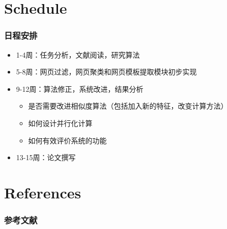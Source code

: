 \documentclass[11pt,presentation]{beamer}
\begin{document}
\section{Schedule}
\label{sec-3}
\begin{frame}
\frametitle{日程安排}
\label{sec-3-1}

\begin{itemize}
\item 1-4周：任务分析，文献阅读，研究算法
\item 5-8周：网页过滤，网页聚类和网页模板提取模块初步实现
\item 9-12周：算法修正，系统改进，结果分析
\begin{itemize}
\item 是否需要改进相似度算法（包括加入新的特征，改变计算方法）
\item 如何设计并行化计算
\item 如何有效评价系统的功能
\end{itemize}
\item 13-15周：论文撰写
\end{itemize}
\end{frame}
\section{References}
\label{sec-4}
\begin{frame}[allowframebreaks]
\frametitle{参考文献}
\label{sec-4-1}

\scriptsize


\end{frame}
\end{document}
